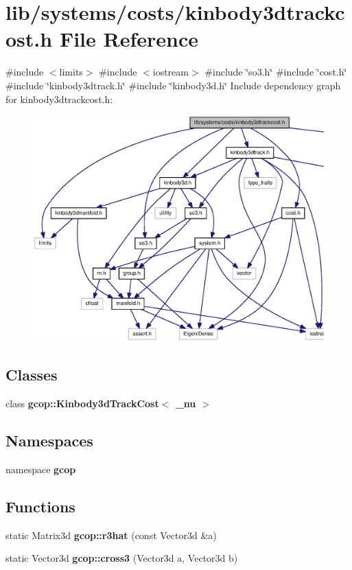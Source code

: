\section{lib/systems/costs/kinbody3dtrackcost.h \-File \-Reference}
\label{kinbody3dtrackcost_8h}
{\ttfamily \#include $<$limits$>$}\*
{\ttfamily \#include $<$iostream$>$}\*
{\ttfamily \#include \char`\"{}so3.\-h\char`\"{}}\*
{\ttfamily \#include \char`\"{}cost.\-h\char`\"{}}\*
{\ttfamily \#include \char`\"{}kinbody3dtrack.\-h\char`\"{}}\*
{\ttfamily \#include \char`\"{}kinbody3d.\-h\char`\"{}}\*
\-Include dependency graph for kinbody3dtrackcost.\-h\-:
\nopagebreak
\begin{figure}[H]
\begin{center}
\leavevmode
\includegraphics[width=350pt]{kinbody3dtrackcost_8h__incl}
\end{center}
\end{figure}
\subsection*{\-Classes}
\begin{DoxyCompactItemize}
\item 
class {\bf gcop\-::\-Kinbody3d\-Track\-Cost$<$ \-\_\-nu $>$}
\end{DoxyCompactItemize}
\subsection*{\-Namespaces}
\begin{DoxyCompactItemize}
\item 
namespace {\bf gcop}
\end{DoxyCompactItemize}
\subsection*{\-Functions}
\begin{DoxyCompactItemize}
\item 
static \-Matrix3d {\bf gcop\-::r3hat} (const \-Vector3d \&a)
\item 
static \-Vector3d {\bf gcop\-::cross3} (\-Vector3d a, \-Vector3d b)
\end{DoxyCompactItemize}
